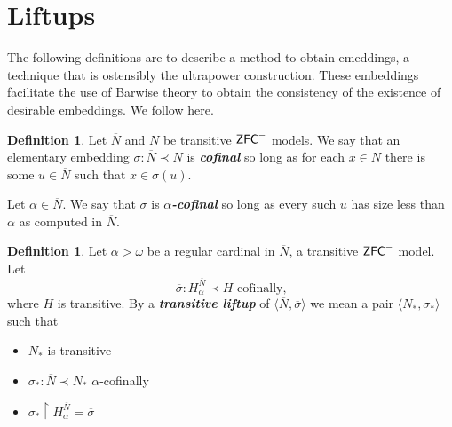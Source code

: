 \documentclass{amsart}
\theoremstyle{definition}
\newtheorem{definition}[theorem]{Definition}
\theoremstyle{remark}
\newcommand{\N}{{\overline{N}}}
\newcommand{\ZFC}{\textup{\ensuremath{\textsf{ZFC}}}}
\begin{document}
\section{Liftups}
\label{sec:Liftups}
The following definitions are to describe a method to obtain emeddings, a technique that is ostensibly the ultrapower construction. These embeddings facilitate the use of Barwise theory to obtain the consistency of the existence of desirable embeddings. We follow \cite[Chapter 1]{Jensen:2012fr} here.

\begin{definition} Let $\N$ and $N$ be transitive $\ZFC^-$ models. We say that an elementary embedding $\sigma: \N \prec N$ is \emph{\textbf{cofinal}} so long as for each $x \in N$ there is some $u \in \N$ such that $x \in \sigma(u)$. 

Let $\alpha \in \N$. We say that $\sigma$ is \emph{\textbf{$\alpha$-cofinal}} so long as every such $u$ has size less than $\alpha$ as computed in $\N$. \end{definition}
	
\begin{definition} Let $\alpha > \omega$ be a regular cardinal in $\N$, a transitive $\ZFC^-$ model. Let 
	$$\overline \sigma: H^{\N}_\alpha \prec H \text{ cofinally,}$$ where $H$ is transitive. By a \emph{\textbf{transitive liftup}} of $\langle \N, \overline \sigma \rangle$ we mean a pair $\langle N_* , \sigma_* \rangle$ such that 
\begin{itemize} 
	\item $N_*$ is transitive
	\item $\sigma_*:\N \prec N_*$ $\alpha$-cofinally
	\item $\sigma_* \upharpoonright H_{\alpha}^{\N}= \overline \sigma$ \qedhere
\end{itemize}	
\end{definition}
\end{document}
